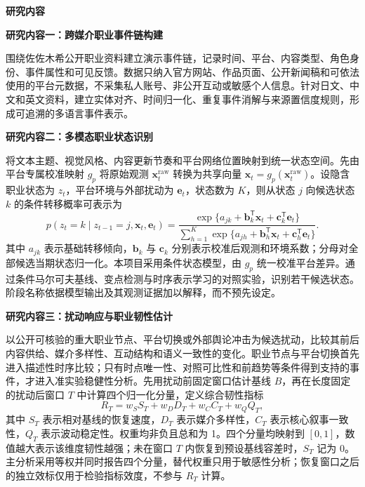 \GXNSFBodyText

\noindent\textbf{研究内容}\par

\noindent\textbf{研究内容一：跨媒介职业事件链构建}\par
围绕佐佐木希公开职业资料建立演示事件链，记录时间、平台、内容类型、角色身份、事件属性和可见反馈。数据只纳入官方网站、作品页面、公开新闻稿和可依法使用的平台元数据，不采集私人账号、非公开互动或敏感个人信息。针对日文、中文和英文资料，建立实体对齐、时间归一化、重复事件消解与来源置信度规则，形成可追溯的多语言事件表示。

\noindent\textbf{研究内容二：多模态职业状态识别}\par
将文本主题、视觉风格、内容更新节奏和平台网络位置映射到统一状态空间。先由平台专属校准映射 $g_p$ 将原始观测 $\bm{x}_t^{\mathrm{raw}}$ 转换为共享向量 $\bm{x}_t=g_p(\bm{x}_t^{\mathrm{raw}})$。设隐含职业状态为 $z_t$，平台环境与外部扰动为 $\bm{e}_t$，状态数为 $K$，则从状态 $j$ 向候选状态 $k$ 的条件转移概率可表示为
\begin{equation}
  p(z_t=k\mid z_{t-1}=j,\bm{x}_t,\bm{e}_t)=
  \frac{\exp\{a_{jk}+\bm{b}_k^{\mathsf T}\bm{x}_t+\bm{c}_k^{\mathsf T}\bm{e}_t\}}
  {\sum_{h=1}^{K}\exp\{a_{jh}+\bm{b}_h^{\mathsf T}\bm{x}_t+\bm{c}_h^{\mathsf T}\bm{e}_t\}}.
  \label{eq:gx-state-transition}
\end{equation}
其中 $a_{jk}$ 表示基础转移倾向，$\bm{b}_k$ 与 $\bm{c}_k$ 分别表示校准后观测和环境系数；分母对全部候选当期状态归一化。本项目采用条件状态模型，由 $g_p$ 统一校准平台差异。通过条件马尔可夫基线、变点检测与时序表示学习的对照实验，识别若干候选状态。阶段名称依据模型输出及其观测证据加以解释，而不预先设定。

\noindent\textbf{研究内容三：扰动响应与职业韧性估计}\par
以公开可核验的重大职业节点、平台切换或外部舆论冲击为候选扰动，比较其前后内容供给、媒介多样性、互动结构和语义一致性的变化。职业节点与平台切换首先进入描述性时序比较；只有时点唯一性、对照可比性和前趋势等条件得到支持的事件，才进入准实验稳健性分析。先用扰动前固定窗口估计基线 $B$，再在长度固定的扰动后窗口 $T$ 中计算四个归一化分量，定义综合韧性指标
\begin{equation}
  R_T=w_S S_T+w_D D_T+w_C C_T+w_Q Q_T,
  \label{eq:gx-resilience}
\end{equation}
其中 $S_T$ 表示相对基线的恢复速度，$D_T$ 表示媒介多样性，$C_T$ 表示核心叙事一致性，$Q_T$ 表示波动稳定性。权重均非负且总和为 1。四个分量均映射到 $[0,1]$，数值越大表示该维度韧性越强；未在窗口 $T$ 内恢复到预设基线容差时，$S_T$ 记为 0。主分析采用等权并同时报告四个分量，替代权重只用于敏感性分析；恢复窗口之后的独立效标仅用于检验指标效度，不参与 $R_T$ 计算。

